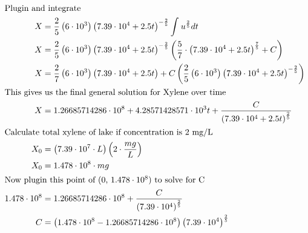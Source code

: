 \documentclass[12pt]{article}
\begin{document}
\begin{align}
  \intertext{Plugin and integrate}
  X                                                                                        & =\frac{2}{5}\left(6\cdot10^{3}\right)\left(7.39\cdot10^{4}+2.5t\right)^{-\frac{2}{5}}\int_{ }^{ }u^{\frac{2}{5}}dt                                                        \\
  X                                                                                        & =\frac{2}{5}\left(6\cdot10^{3}\right)\left(7.39\cdot10^{4}+2.5t\right)^{-\frac{2}{5}}\left(\frac{5}{7}\cdot\left(7.39\cdot10^{4}+2.5t\right)^{\frac{7}{5}}+C\right)       \\
  X                                                                                        & =\frac{2}{7}\left(6\cdot10^{3}\right)\left(7.39\cdot10^{4}+2.5t\right)+C\left(\frac{2}{5}\left(6\cdot10^{3}\right)\left(7.39\cdot10^{4}+2.5t\right)^{-\frac{2}{5}}\right) \\
  \intertext{This gives us the final general solution for Xylene over time}
  X                                                                                        & =1.26685714286\cdot10^{8}+4.28571428571\cdot10^{3}t+\frac{C}{\left(7.39\cdot10^{4}+2.5t\right)^{\frac{2}{5}}}                                                             \\
  \intertext{Calculate total xylene of lake if concentration is 2 mg/L}
  X_{0}                                                                                    & =\left(7.39\cdot10^{7}\cdot L\right)\left(2\cdot\frac{mg}{L}\right)                                                                                                       \\
  X_{0}                                                                                    & =1.478\cdot10^{8}\cdot mg                                                                                                                                                 \\
  \intertext{Now plugin this point of (0, $1.478\cdot10^{8}$) to solve for C}
  1.478\cdot10^{8}                                                                         & =1.26685714286\cdot10^{8}+\frac{C}{\left(7.39\cdot10^{4}\right)^{\frac{2}{5}}}                                                                                            \\
  C                                                                                        & =\left(1.478\cdot10^{8}-1.26685714286\cdot10^{8}\right)\left(7.39\cdot10^{4}\right)^{\frac{2}{5}}                                                                         \\

\end{align}
\end{document}
